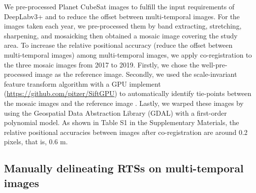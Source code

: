 \documentclass[authoryear,preprint,review,12pt]{elsarticle}
\begin{document}
We pre-processed Planet CubeSat images to fulfill the input requirements of DeepLabv3+ %
and to reduce the offset between multi-temporal images. 
For the images taken each year, we pre-processed them by band extracting, stretching, sharpening, and mosaicking then obtained a mosaic image covering the study area. 
To increase the relative positional accuracy (reduce the offset between multi-temporal images) among multi-temporal images, we apply co-registration to the three mosaic images from 2017 to 2019. 
Firstly, we chose the well-pre-processed image \citep{huang2020using} as the reference image. 
Secondly, we used the scale-invariant feature transform algorithm \citep{lowe2004distinctive} with a GPU implement (\url{https://github.com/pitzer/SiftGPU}) to automatically identify tie-points between %
the mosaic images and the reference image \citep{huang2016a}. 
Lastly, we warped these images by using the Geospatial Data Abstraction Library (GDAL) with a first-order polynomial model.
As shown in Table S1 in the Supplementary Materials, the relative positional accuracies between images after co-registration are around 0.2 pixels, that is, 0.6 m. 



\subsection{Manually delineating RTSs on multi-temporal images}
\label{sec_manu_delineating}
\end{document}

